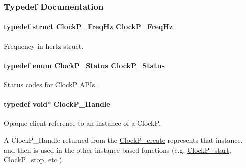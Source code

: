 \subsubsection{Typedef Documentation}
\paragraph[{Clock\+P\+\_\+\+Freq\+Hz}]{\setlength{\rightskip}{0pt plus 5cm}typedef struct {\bf Clock\+P\+\_\+\+Freq\+Hz}  {\bf Clock\+P\+\_\+\+Freq\+Hz}}\label{_clock_p_8h_a25fc160d58d458b85ec41dea37eaf902}


Frequency-\/in-\/hertz struct. 

\paragraph[{Clock\+P\+\_\+\+Status}]{\setlength{\rightskip}{0pt plus 5cm}typedef enum {\bf Clock\+P\+\_\+\+Status}  {\bf Clock\+P\+\_\+\+Status}}\label{_clock_p_8h_ae1edd74163efee26d095e9a3d37f5a05}


Status codes for Clock\+P A\+P\+Is. 

\paragraph[{Clock\+P\+\_\+\+Handle}]{\setlength{\rightskip}{0pt plus 5cm}typedef void$\ast$ {\bf Clock\+P\+\_\+\+Handle}}\label{_clock_p_8h_a003dd74e948999fe5c3f45d8f51501f1}


Opaque client reference to an instance of a Clock\+P. 

A Clock\+P\+\_\+\+Handle returned from the \hyperlink{_clock_p_8h_a1eab19790e2a9a2ed41fb4d900a3e12e}{Clock\+P\+\_\+create} represents that instance. and then is used in the other instance based functions (e.\+g. \hyperlink{_clock_p_8h_a72fe821307efbdb0e314108857e39e56}{Clock\+P\+\_\+start}, \hyperlink{_clock_p_8h_a45b3053db24b21ebd22bc1133c40d1d0}{Clock\+P\+\_\+stop}, etc.). 
